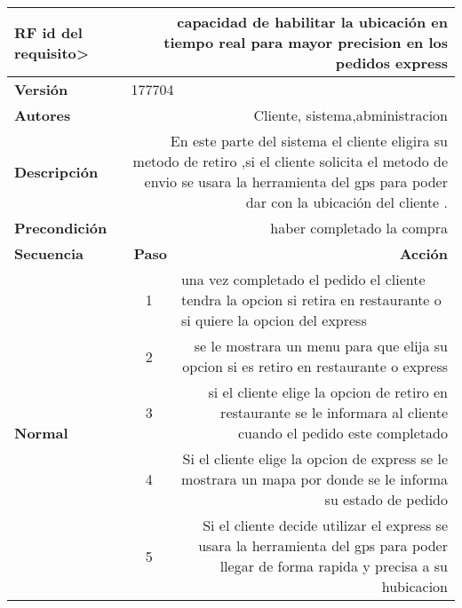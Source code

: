 \documentclass[conference]{IEEEtran}
\begin{document}
\begin{table}[H]
  \centering
   \begin{adjustbox}{width=0.45\textwidth}
    \begin{tabular}{|p{11.215em}|r|r|}
    \toprule
    \textbf{RF id del requisito>} & \multicolumn{2}{p{37.355em}|}{\textbf{capacidad de habilitar la ubicación en tiempo real para mayor precision en los pedidos express }} \\
    \midrule
    \textbf{Versión} & \multicolumn{2}{l|}{177704} \\
    \midrule
    \textbf{Autores} & \multicolumn{2}{p{37.355em}|}{Cliente, sistema,abministracion } \\
    \midrule
    \textbf{Descripción} & \multicolumn{2}{p{37.355em}|}{En este parte del sistema el cliente eligira su metodo de retiro ,si el cliente solicita el metodo de envio  se usara la herramienta del gps para poder dar con la ubicación del cliente . } \\
    \midrule
    \textbf{Precondición} & \multicolumn{2}{p{37.355em}|}{haber completado la compra } \\
    \midrule
    \textbf{Secuencia} & \multicolumn{1}{p{5.355em}|}{\textbf{Paso}} & \multicolumn{1}{p{32em}|}{\textbf{Acción}} \\
    \midrule
    \multirow{7}[12]{*}{\textbf{Normal}} & \multicolumn{1}{c|}{\multirow{2}[2]{*}{1}} & \multicolumn{1}{l|}{\multirow{2}[2]{*}{una vez completado el pedido el cliente tendra la opcion si  retira en restaurante o si quiere la opcion del express }} \\
    \multicolumn{1}{|c|}{} &       &  \\
\cmidrule{2-3}    \multicolumn{1}{|c|}{} & \multicolumn{1}{c|}{2} & \multicolumn{1}{p{32em}|}{se le mostrara un menu para que elija su opcion si es retiro en restaurante o express} \\
\cmidrule{2-3}    \multicolumn{1}{|c|}{} & \multicolumn{1}{c|}{3} & \multicolumn{1}{p{32em}|}{si el cliente elige la opcion de retiro en restaurante se le informara al cliente cuando el pedido este completado } \\
\cmidrule{2-3}    \multicolumn{1}{|c|}{} & \multicolumn{1}{c|}{4} & \multicolumn{1}{p{32em}|}{Si el cliente elige la opcion de express se le mostrara un mapa por donde se le informa su estado de pedido } \\
\cmidrule{2-3}    \multicolumn{1}{|c|}{} & \multicolumn{1}{c|}{5} & \multicolumn{1}{p{32em}|}{Si el cliente decide utilizar el express se usara la herramienta del gps para poder llegar de forma rapida y precisa a su hubicacion } \\

\end{tabular}
\end{adjustbox}
\end{table}
\end{document}
